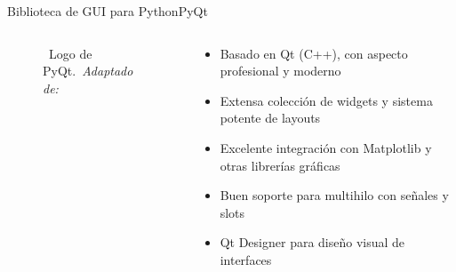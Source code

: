 \begin{frame}{Biblioteca de GUI para Python}{PyQt}
    \begin{columns}
        \begin{column}{0.4\textwidth}
            \centering
            \begin{figure}[H]
                \centering
                \vspace{-0.25cm}
                \caption{\tiny~Logo de PyQt.~\textit{Adaptado de:}~\cite{qt_wiki}}%
                \label{fig:PyQt_logo}
            \end{figure}
        \end{column}
        \begin{column}{0.6\textwidth}
            \begin{itemize}
                \item Basado en Qt (C++), con aspecto profesional y moderno
                \item Extensa colección de widgets y sistema potente de layouts
                \item Excelente integración con Matplotlib y otras librerías gráficas
                \item Buen soporte para multihilo con señales y slots
                \item Qt Designer para diseño visual de interfaces
            \end{itemize}
        \end{column}
    \end{columns}
\end{frame}

